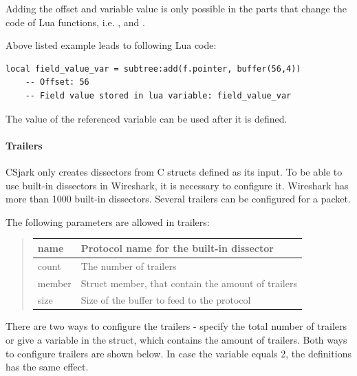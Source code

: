 \documentclass[A4paper,10pt,english]{sphinxmanual}
\begin{document}
Adding the offset and variable value is only possible in the parts that change the code of Lua functions, i.e. ,  and .

Above listed example leads to following Lua code:

\begin{Verbatim}[commandchars=\\\{\}]
local field_value_var = subtree:add(f.pointer, buffer(56,4))
    -- Offset: 56
    -- Field value stored in lua variable: field_value_var
\end{Verbatim}

The value of the referenced variable can be used after it is defined.


\paragraph{Trailers}
\label{user/config:trailers}
CSjark only creates dissectors from C structs defined as its input. To be able to use built-in dissectors in Wireshark, it is necessary to configure it. Wireshark has more than 1000 built-in dissectors. Several trailers can be configured for a packet.

The following parameters are allowed in trailers:
\begin{quote}

\begin{tabulary}{\linewidth}{|L|L|}
\hline

name
 & 
Protocol name for the built-in dissector
\\\hline

count
 & 
The number of trailers
\\\hline

member
 & 
Struct member, that contain the amount of trailers
\\\hline

size
 & 
Size of the buffer to feed to the protocol
\\\hline
\end{tabulary}

\end{quote}

There are two ways to configure the trailers - specify the total number of trailers or give a variable in the struct, which contains the amount of trailers. Both ways to configure trailers are shown below. In case the variable  equals 2, the definitions has the same effect.
\end{document}
